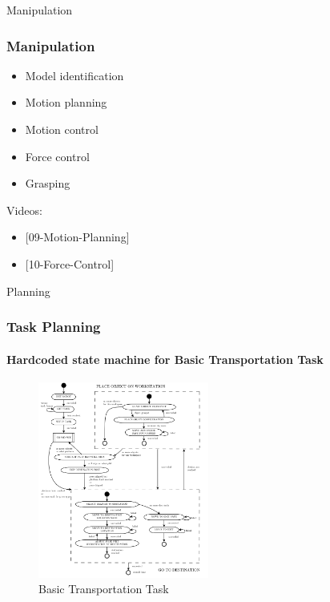 \documentclass{beamer}
\begin{document}
\begin{frame}[standout]
     Manipulation
\end{frame}


\begin{frame}
\frametitle{Manipulation}
\begin{itemize}
    \item <1->Model identification
    \item <2->Motion planning
    \item <3->Motion control
    \item <4->Force control
    \item <5->Grasping
\end{itemize}

{\footnotesize
Videos:
\begin{itemize}
\item <2->{[09-Motion-Planning]}
\item <4->{[10-Force-Control]}
\end{itemize}}
\end{frame}

\begin{frame}[standout]
     Planning
\end{frame}

\begin{frame}
\frametitle{Task Planning}
\framesubtitle{Hardcoded state machine for Basic Transportation Task}
\begin{figure}[H]
     \centering
     \includegraphics[width=0.5\textwidth]{images/BTT.png}
     \caption{Basic Transportation Task~\cite{Lima}}
     \label{fig:btt}
\end{figure}
\end{frame}
\end{document}
